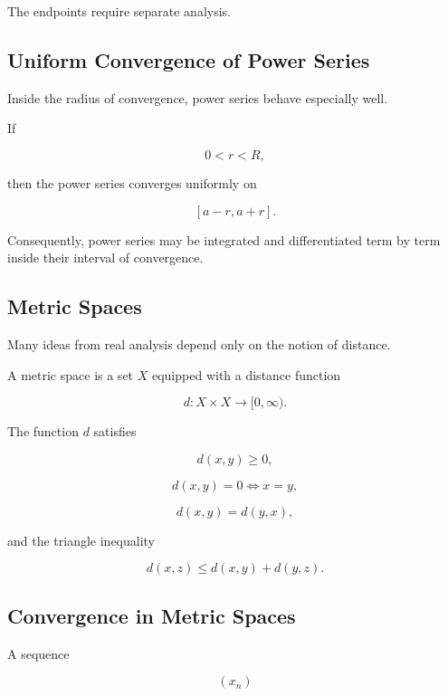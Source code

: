 The endpoints require separate analysis.

\subsection{Uniform Convergence of Power Series}
\label{subsec:uniform-power-series}

Inside the radius of convergence, power series behave especially well.

If

\[
0<r<R,
\]

then the power series converges uniformly on

\[
[a-r,a+r].
\]

Consequently, power series may be integrated and differentiated term by
term inside their interval of convergence.

\subsection{Metric Spaces}
\label{subsec:metric-spaces-real-analysis}

Many ideas from real analysis depend only on the notion of distance.

A metric space is a set \(X\) equipped with a distance function

\[
\boxed{
d:X\times X\to[0,\infty).
}
\]

The function \(d\) satisfies

\[
d(x,y)\geq0,
\]

\[
d(x,y)=0
\iff
x=y,
\]

\[
d(x,y)=d(y,x),
\]

and the triangle inequality

\[
\boxed{
d(x,z)
\leq
d(x,y)+d(y,z).
}
\]

\subsection{Convergence in Metric Spaces}
\label{subsec:metric-space-convergence}

A sequence

\[
(x_n)
\]

